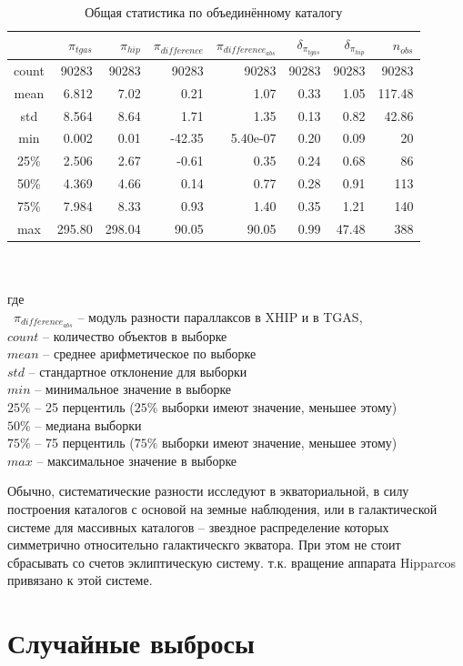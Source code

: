 \documentclass[14pt]{article} %
\begin{document}
\begin{table}[h!]
\caption{Общая статистика по объединённому каталогу}
\label{tabular:tgas_st}
\begin{tabular}{c|r|r|r|r|r|r|r}
\hline 	
&$\pi_{tgas}$&$\pi_{hip}$&$\pi_{difference}$&$\pi_{difference_{abs}}$&$\delta_{\pi_{tgas}}$&$\delta_{\pi_{hip}}$&$n_{obs}$\\
\hline
\hline 	
count&90283&90283&90283&90283&90283&90283&90283\\
\hline 
mean&6.812&7.02&0.21&1.07&0.33&1.05&117.48\\
std&8.564&8.64&1.71&1.35&0.13&0.82&42.86\\
min&0.002&0.01&-42.35&5.40e-07&0.20&0.09&20\\
25\%&2.506&2.67&-0.61&0.35&0.24&0.68&86\\
50\%&4.369&4.66&0.14&0.77&0.28&0.91&113\\
75\%&7.984&8.33&0.93&1.40&0.35&1.21&140\\
max&295.80&298.04&90.05&90.05&0.99&47.48&388\\
\end{tabular}\\{\\где\\
~$\pi_{difference_{abs}}$ -- модуль разности параллаксов в XHIP и в TGAS,\\
$count$ -- количество объектов в выборке\\
$mean$ -- среднее арифметическое по выборке\\
$std$ -- стандартное отклонение для выборки\\
$min$ -- минимальное значение в выборке\\
$25\%$ -- 25 перцентиль ($25\%$ выборки имеют значение, меньшее этому)\\
$50\%$ -- медиана выборки\\
$75\%$ -- 75 перцентиль ($75\%$ выборки имеют значение, меньшее этому)\\
$max$ -- максимальное значение в выборке}
\end{table}

Обычно, систематические разности исследуют в экваториальной, в силу построения каталогов с основой на земные наблюдения, или в галактической системе для массивных каталогов -- звездное распределение которых симметрично относительно галактическго экватора. При этом не стоит сбрасывать со счетов эклиптическую систему. т.к. вращение аппарата Hipparcos привязано к этой системе.

\section{Случайные выбросы}\label{sub:smthrs}
\end{document}
